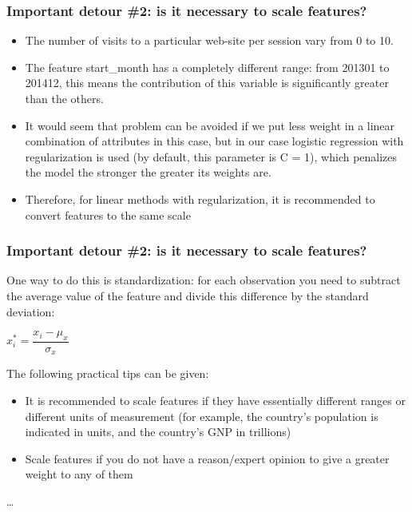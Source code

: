 \begin{frame}[fragile]\frametitle{Important detour \#2: is it necessary to scale features?}

\begin{itemize}
\item The number of visits to a particular web-site per session vary from 0 to 10. 
\item The feature start\_month has a completely different range: from 201301 to 201412, this means the contribution of this variable is significantly greater than the others.
\item It would seem that problem can be avoided if we put less weight in a linear combination of attributes in this case, but in our case logistic regression with regularization is used (by default, this parameter is C = 1), which penalizes the model the stronger the greater its weights are. 
\item Therefore, for linear methods with regularization, it is recommended to convert features to the same scale
\end{itemize}

\end{frame}

\begin{frame}[fragile]\frametitle{Important detour \#2: is it necessary to scale features?}
One way to do this is standardization: for each observation you need to subtract the average value of the feature and divide this difference by the standard deviation:

$x^{*}_{i} = \dfrac{x_{i} - \mu_x}{\sigma_x}$

The following practical tips can be given:
\begin{itemize}
\item It is recommended to scale features if they have essentially different ranges or different units of measurement (for example, the country's population is indicated in units, and the country's GNP in trillions)
\item  Scale features if you do not have a reason/expert opinion to give a greater weight to any of them

\end{itemize}
\ldots
\end{frame}


